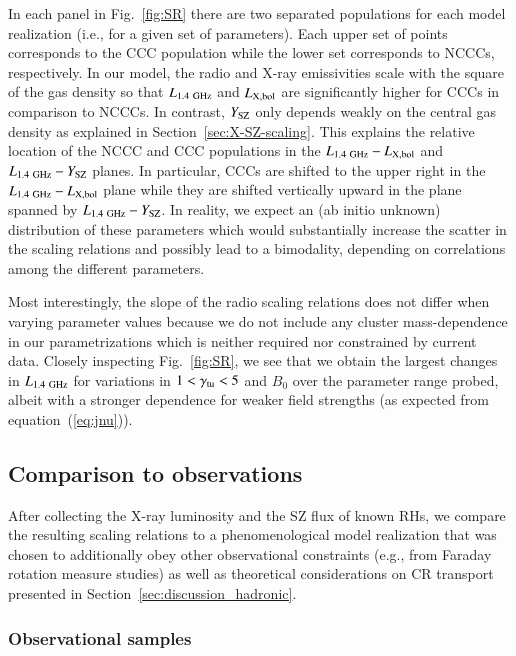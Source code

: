 \documentclass[useAMS,usenatbib]{mn2e}
\begin{document}
In each panel in Fig.~\ref{fig:SR} there are two separated populations for
each model realization (i.e., for a given set of parameters). Each upper set of
points corresponds to the CCC population while the lower set corresponds to
NCCCs, respectively. In our model, the radio and X-ray emissivities scale with
the square of the gas density so that $L_{1.4~{\mathrm{GHz}}}$ and $L_{{\mathrm{X,bol}}}$
are significantly higher for CCCs in comparison to NCCCs. In contrast,
$Y_{{\mathrm{SZ}}}$ only depends weakly on the central gas density as explained in
Section~\ref{sec:X-SZ-scaling}. This explains the relative location of the NCCC and
CCC populations in the $L_{1.4~{\mathrm{GHz}}}-L_{{\mathrm{X,bol}}}$ and
$L_{1.4~{\mathrm{GHz}}}-Y_{{\mathrm{SZ}}}$ planes. In particular, CCCs are shifted to the
upper right in the $L_{1.4~{\mathrm{GHz}}}-L_{{\mathrm{X,bol}}}$ plane while they are
shifted vertically upward in the plane spanned by
$L_{1.4~{\mathrm{GHz}}}-Y_{{\mathrm{SZ}}}$. In reality, we expect an (ab initio unknown)
distribution of these parameters which would substantially increase the scatter
in the scaling relations and possibly lead to a bimodality, depending on
correlations among the different parameters.

Most interestingly, the slope of the radio scaling relations does not differ
when varying parameter values because we do not include any cluster
mass-dependence in our parametrizations which is neither required nor
constrained by current data. Closely inspecting Fig.~\ref{fig:SR}, we see that
we obtain the largest changes in $L_{1.4~{\mathrm{GHz}}}$ for variations in
$1<\gamma_{{\mathrm{tu}}}<5$ and $B_0$ over the parameter range probed, albeit with a
stronger dependence for weaker field strengths (as expected from
equation~(\ref{eq:jnu})).


\subsection{Comparison to observations}
\label{sec:scaling-obs}
 
After collecting the X-ray luminosity and the SZ flux of known RHs, we compare
the resulting scaling relations to a phenomenological model realization that was
chosen to additionally obey other observational constraints (e.g., from Faraday
rotation measure studies) as well as theoretical considerations on CR transport
presented in Section~\ref{sec:discussion_hadronic}.


\subsubsection{Observational samples}
\end{document}
